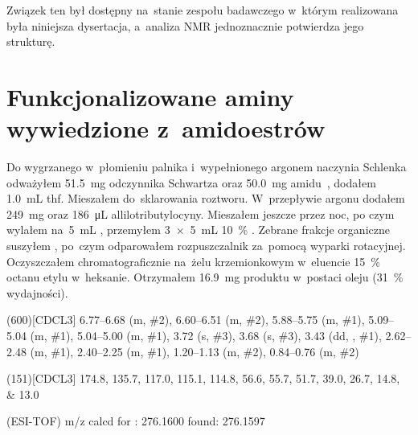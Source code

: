 Związek ten był dostępny na~stanie zespołu badawczego w~którym realizowana była niniejsza
  dysertacja, a~analiza NMR jednoznacznie potwierdza jego strukturę.


\section{Funkcjonalizowane aminy wywiedzione z~amidoestrów}\label{experimental:amidoester-products}
Do wygrzanego w~płomieniu palnika i~wypełnionego argonem naczynia Schlenka odważyłem
  \SI{51.5}{\mg} odczynnika Schwartza oraz \SI{50.0}{\mg} amidu~,
  dodałem \SI{1.0}{\mL} \gls{thf}.
Mieszałem do~sklarowania roztworu.
W~przepływie argonu dodałem \SI{249}{\mg}  oraz \SI{186}{\uL} allilotributylocyny.
Mieszałem jeszcze przez noc, po czym wylałem na~\SI{5}{\mL} ,
  przemyłem \SI[product-units = single]{3 x 5}{\mL} \SI{10}{\percent} .
Zebrane frakcje organiczne suszyłem , po~czym odparowałem rozpuszczalnik za~pomocą
  wyparki rotacyjnej.
Oczyszczałem chromatograficznie na~żelu krzemionkowym w~eluencie \SI{15}{\percent} octanu
  etylu w~heksanie.
Otrzymałem \SI{16.9}{\mg} produktu w~postaci oleju (\SI{31}{\percent} wydajności).

\begin{fullexp}
  \NMR(600)[CDCL3] \numrange{6.77}{6.68} (m, \#{2}), \numrange{6.60}{6.51} (m, \#{2}), \numrange{5.88}{5.75} (m, \#{1}), \numrange{5.09}{5.04} (m, \#{1}), \numrange{5.04}{5.00} (m, \#{1}), \num{3.72} (s, \#{3}), \num{3.68} (s, \#{3}), \num{3.43} (dd, , \#{1}), \numrange{2.62}{2.48} (m, \#{1}), \numrange{2.40}{2.25} (m, \#{1}), \numrange{1.20}{1.13} (m, \#{2}), \numrange{0.84}{0.76} (m, \#{2})\par\noindent
  (151)[CDCL3] \numlist{174.8; 135.7; 117.0; 115.1; 114.8; 56.6; 55.7; 51.7; 39.0; 26.7; 14.8; 13.0}\par\noindent
   (ESI-TOF) m/z calcd for : \num{276.1600} found: \num{276.1597}
\end{fullexp}

